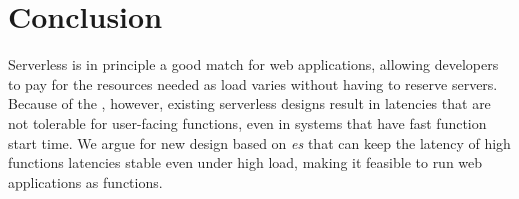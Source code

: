 \section{Conclusion}

Serverless is in principle a good match for web applications, allowing
developers to pay for the resources needed as load varies without having to
reserve servers. Because of the \problem, however, existing serverless designs
result in latencies that are not tolerable for user-facing functions, even in
systems that have fast function start time.  We argue for new design based on
\emph{\priceclass{}es} that can keep the latency of high \class{} functions
latencies stable even under high load, making it feasible to run web
applications as functions.
